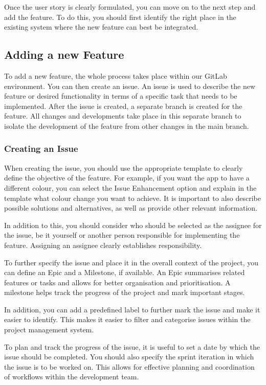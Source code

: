 \documentclass[12pt]{article}
\newcounter{fr}
\begin{document}
Once the user story is clearly formulated, you can move on to the next step and add the feature. To do this, you should first identify the right place in the existing system where the new feature can best be integrated. 

\subsection{Adding a new Feature}
To add a new feature, the whole process takes place within our GitLab environment. You can then create an issue. An issue is used to describe the new feature or desired functionality in terms of a specific task that needs to be implemented.
After the issue is created, a separate branch is created for the feature. All changes and developments take place in this separate branch to isolate the development of the feature from other changes in the main branch.

\subsubsection{Creating an Issue}
When creating the issue, you should use the appropriate template to clearly define the objective of the feature. For example, if you want the app to have a different colour, you can select the Issue Enhancement option and explain in the template what colour change you want to achieve. It is important to also describe possible solutions and alternatives, as well as provide other relevant information.

In addition to this, you should consider who should be selected as the assignee for the issue, be it yourself or another person responsible for implementing the feature. Assigning an assignee clearly establishes responsibility.

To further specify the issue and place it in the overall context of the project, you can define an Epic and a Milestone, if available. An Epic summarises related features or tasks and allows for better organisation and prioritisation. A milestone helps track the progress of the project and mark important stages.

In addition, you can add a predefined label to further mark the issue and make it easier to identify. This makes it easier to filter and categorise issues within the project management system.

To plan and track the progress of the issue, it is useful to set a date by which the issue should be completed. You should also specify the sprint iteration in which the issue is to be worked on. This allows for effective planning and coordination of workflows within the development team.
\end{document}
